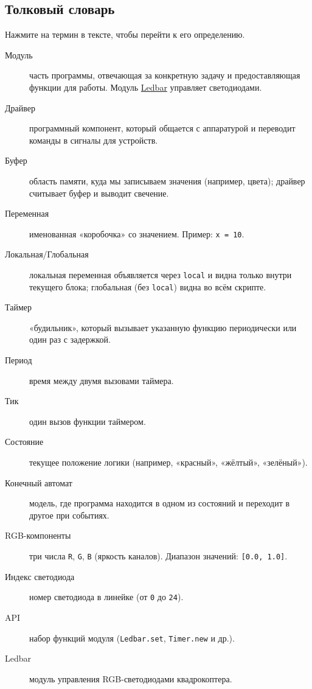 \subsection{Толковый словарь}
Нажмите на термин в тексте, чтобы перейти к его определению.
\begin{description}
  \item[\hypertarget{term:module}{Модуль}] часть программы, отвечающая за конкретную задачу и предоставляющая функции для работы. Модуль \hyperlink{term:ledbar}{Ledbar} управляет светодиодами.
  \item[\hypertarget{term:driver}{Драйвер}] программный компонент, который общается с аппаратурой и переводит команды в сигналы для устройств.
  \item[\hypertarget{term:buffer}{Буфер}] область памяти, куда мы записываем значения (например, цвета); драйвер считывает буфер и выводит свечение.
  \item[\hypertarget{term:variable}{Переменная}] именованная «коробочка» со значением. Пример: \verb|x = 10|.
  \item[\hypertarget{term:scope}{Локальная/Глобальная}] локальная переменная объявляется через \verb|local| и видна только внутри текущего блока; глобальная (без \verb|local|) видна во всём скрипте.
  \item[\hypertarget{term:timer}{Таймер}] «будильник», который вызывает указанную функцию периодически или один раз с задержкой.
  \item[\hypertarget{term:period}{Период}] время между двумя вызовами таймера.
  \item[\hypertarget{term:tick}{Тик}] один вызов функции таймером.
  \item[\hypertarget{term:state}{Состояние}] текущее положение логики (например, «красный», «жёлтый», «зелёный»).
  \item[\hypertarget{term:automaton}{Конечный автомат}] модель, где программа находится в одном из состояний и переходит в другое при событиях.
  \item[\hypertarget{term:rgb}{RGB-компоненты}] три числа \verb|R|, \verb|G|, \verb|B| (яркость каналов). Диапазон значений: \verb|[0.0, 1.0]|.
  \item[\hypertarget{term:index}{Индекс светодиода}] номер светодиода в линейке (от \verb|0| до \verb|24|).
  \item[\hypertarget{term:api}{API}] набор функций модуля (\verb|Ledbar.set|, \verb|Timer.new| и др.).
  \item[\hypertarget{term:ledbar}{Ledbar}] модуль управления RGB-светодиодами квадрокоптера.
\end{description}
